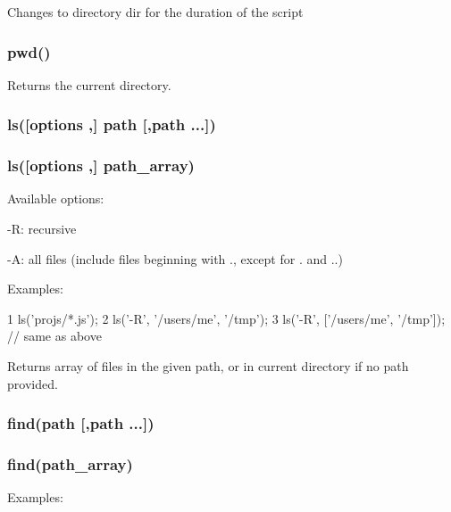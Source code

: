 Changes to directory {\ttfamily dir} for the duration of the script

\subsubsection*{pwd()}

Returns the current directory.

\subsubsection*{ls(\mbox{[}options ,\mbox{]} path \mbox{[},path ...\mbox{]})}

\subsubsection*{ls(\mbox{[}options ,\mbox{]} path\+\_\+array)}

Available options\+:


\begin{DoxyItemize}
\item {\ttfamily -\/\+R}\+: recursive
\item {\ttfamily -\/\+A}\+: all files (include files beginning with {\ttfamily .}, except for {\ttfamily .} and {\ttfamily ..})
\end{DoxyItemize}

Examples\+:


\begin{DoxyCode}
1 ls('projs/*.js');
2 ls('-R', '/users/me', '/tmp');
3 ls('-R', ['/users/me', '/tmp']); // same as above
\end{DoxyCode}


Returns array of files in the given path, or in current directory if no path provided.

\subsubsection*{find(path \mbox{[},path ...\mbox{]})}

\subsubsection*{find(path\+\_\+array)}

Examples\+:




